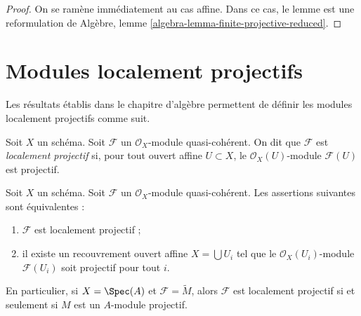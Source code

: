 \begin{proof}
On se ramène immédiatement au cas affine. Dans
ce cas, le lemme est une reformulation de
Algèbre, lemme \ref{algebra-lemma-finite-projective-reduced}.
\end{proof}




\section{Modules localement projectifs}
\label{section-locally-projective}

\noindent
Les résultats établis dans le chapitre d'algèbre permettent
de définir les modules localement projectifs comme suit.

\begin{definition}
\label{definition-locally-projective}
Soit $X$ un schéma. Soit $\mathcal{F}$ un
$\mathcal{O}_X$-module quasi-cohérent. On dit que $\mathcal{F}$ est {\it localement projectif}
si, pour tout ouvert affine $U \subset X$, le $\mathcal{O}_X(U)$-module
$\mathcal{F}(U)$ est projectif.
\end{definition}

\begin{lemma}
\label{lemma-locally-projective}
Soit $X$ un schéma.
Soit $\mathcal{F}$ un $\mathcal{O}_X$-module
quasi-cohérent. Les assertions suivantes sont équivalentes :
\begin{enumerate}
\item $\mathcal{F}$ est localement projectif ;
\item il existe un recouvrement ouvert affine $X = \bigcup U_i$
tel que le $\mathcal{O}_X(U_i)$-module
$\mathcal{F}(U_i)$ soit projectif pour tout $i$.
\end{enumerate}
En particulier, si $X = \Spec(A)$ et $\mathcal{F} = \widetilde{M}$,
alors $\mathcal{F}$ est localement projectif si et seulement si $M$ est un
$A$-module projectif.
\end{lemma}

